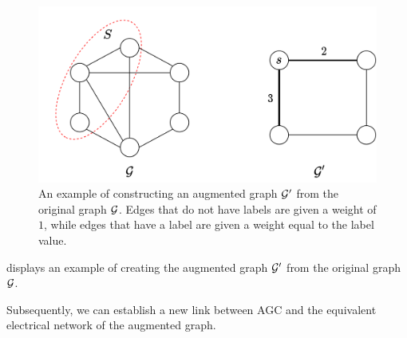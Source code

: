 \documentclass[10pt,journal,compsoc,twocolumn,twoside]{IEEEtran}
\begin{document}
\begin{figure}[!t]
    \centering
    \includegraphics[width=0.8\linewidth]{augmented_graph.png}
    \caption{An example of constructing an augmented graph \(\mathcal{G}'\) from the original graph \(\mathcal{G}\). Edges that do not have labels are given a weight of \(1\), while edges that have a label are given a weight equal to the label value.}
    \label{fig:augmented-graph}
\end{figure}

 displays an example of creating the augmented graph \(\mathcal{G}'\) from the original graph \(\mathcal{G}\).

Subsequently, we can establish a new link between AGC and the equivalent electrical network of the augmented graph.
\end{document}
